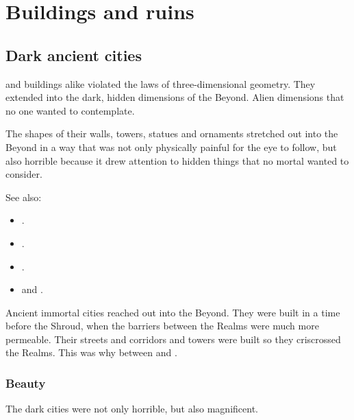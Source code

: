 \section{Buildings and ruins}









\subsection{Dark ancient cities}
\Draconian and \bane buildings alike violated the laws of three-dimensional geometry.
They extended into the dark, hidden dimensions of the Beyond. 
Alien dimensions that no one wanted to contemplate. 

The shapes of their walls, towers, statues and ornaments stretched out into the Beyond in a way that was not only physically painful for the eye to follow, but also horrible because it drew attention to hidden things that no mortal wanted to consider. 

See also:
\begin{itemize}
  \item {}.
  \item {}.
  \item {}.
  \item {} and .
\end{itemize}

Ancient immortal cities reached out into the Beyond. 
They were built in a time before the Shroud, when the barriers between the Realms were much more permeable. 
Their streets and corridors and towers were built so they criscrossed the Realms. 
This was why  between \Machai and \Azmith. 





\subsubsection{Beauty}
The dark cities were not only horrible, but also magnificent. 


